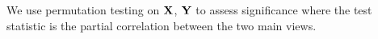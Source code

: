 \documentclass{llncs}
\newcommand{\X}{{\bf X}}
\newcommand{\x}{{\bf x}}
\newcommand{\Y}{{\bf Y}}
\newcommand{\y}{{\bf y}}
\newcommand{\Z}{{\bf Z}}
\begin{document}
We use permutation testing on $\X$, $\Y$ to assess significance where
the test statistic is the partial correlation between the two main views.

 

\end{document}
